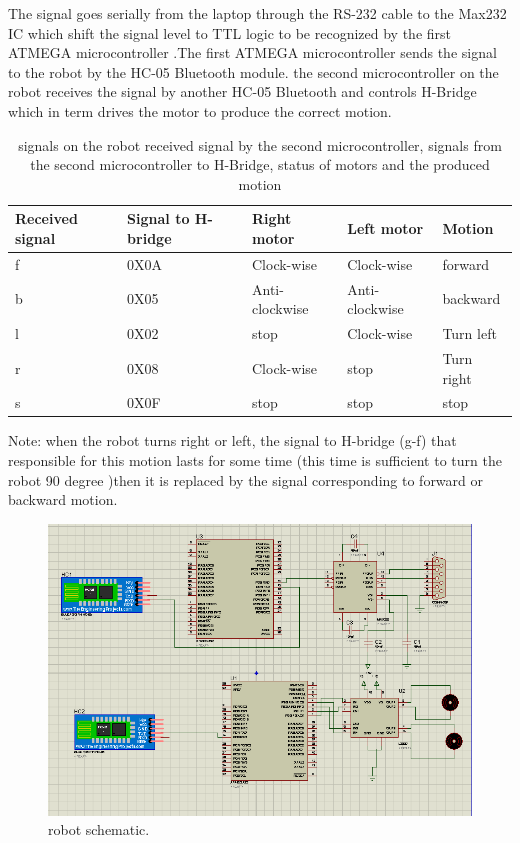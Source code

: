 \documentclass[12pt, a4paper, twoside]{report}
\begin{document}
The signal goes serially from the laptop through the RS-232 cable to the Max232 IC which shift the signal level to TTL logic to be recognized by the first ATMEGA microcontroller .The first ATMEGA microcontroller sends the signal to the robot by the HC-05 Bluetooth module.
the second microcontroller on the robot receives the signal by another HC-05 Bluetooth and controls H-Bridge which in term drives the motor to produce the correct motion.
\begin{table}[!h]
\centering
\begin{tabular}{|l|l|l|l|l|}
\hline
\textbf{Received signal} & \textbf{Signal to H-bridge} & \textbf{Right motor} & \textbf{Left motor} & \textbf{Motion} \\ \hline
f                        & 0X0A                        & Clock-wise           & Clock-wise          & forward         \\ \hline
b                        & 0X05                        & Anti-clockwise       & Anti-clockwise      & backward        \\ \hline
l                        & 0X02                        & stop                 & Clock-wise          & Turn left       \\ \hline
r                        & 0X08                        & Clock-wise           & stop                & Turn right      \\ \hline
s                        & 0X0F                        & stop                 & stop                & stop            \\ \hline
\end{tabular}
\caption{signals on the robot received signal by the second 
microcontroller, signals from the second microcontroller to H-Bridge, 
status of motors and the produced motion}
\label{tab:signals-robot}
\end{table}

Note: when the robot turns right or left, the signal to H-bridge (g-f) that responsible for this motion lasts for some time (this time is sufficient to turn the robot 90 degree )then it is replaced by the signal corresponding to forward or backward motion.
\begin{figure}[!h]
	\centering
	\includegraphics[width=1\textwidth]
	{images/chapter6/hardware-5}
	\caption{robot schematic.}
	\label{fig:hardware-5}
\end{figure}
\end{document}

